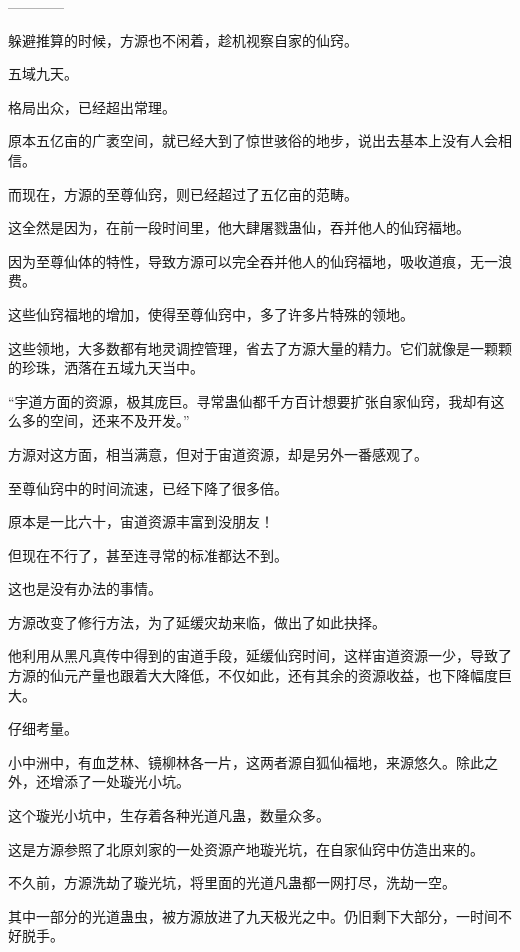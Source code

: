 
\begin{this_body}

------------

躲避推算的时候，方源也不闲着，趁机视察自家的仙窍。

五域九天。

格局出众，已经超出常理。

原本五亿亩的广袤空间，就已经大到了惊世骇俗的地步，说出去基本上没有人会相信。

而现在，方源的至尊仙窍，则已经超过了五亿亩的范畴。

这全然是因为，在前一段时间里，他大肆屠戮蛊仙，吞并他人的仙窍福地。

因为至尊仙体的特性，导致方源可以完全吞并他人的仙窍福地，吸收道痕，无一浪费。

这些仙窍福地的增加，使得至尊仙窍中，多了许多片特殊的领地。

这些领地，大多数都有地灵调控管理，省去了方源大量的精力。它们就像是一颗颗的珍珠，洒落在五域九天当中。

“宇道方面的资源，极其庞巨。寻常蛊仙都千方百计想要扩张自家仙窍，我却有这么多的空间，还来不及开发。”

方源对这方面，相当满意，但对于宙道资源，却是另外一番感观了。

至尊仙窍中的时间流速，已经下降了很多倍。

原本是一比六十，宙道资源丰富到没朋友！

但现在不行了，甚至连寻常的标准都达不到。

这也是没有办法的事情。

方源改变了修行方法，为了延缓灾劫来临，做出了如此抉择。

他利用从黑凡真传中得到的宙道手段，延缓仙窍时间，这样宙道资源一少，导致了方源的仙元产量也跟着大大降低，不仅如此，还有其余的资源收益，也下降幅度巨大。

仔细考量。

小中洲中，有血芝林、镜柳林各一片，这两者源自狐仙福地，来源悠久。除此之外，还增添了一处璇光小坑。

这个璇光小坑中，生存着各种光道凡蛊，数量众多。

这是方源参照了北原刘家的一处资源产地璇光坑，在自家仙窍中仿造出来的。

不久前，方源洗劫了璇光坑，将里面的光道凡蛊都一网打尽，洗劫一空。

其中一部分的光道蛊虫，被方源放进了九天极光之中。仍旧剩下大部分，一时间不好脱手。


\end{this_body}
